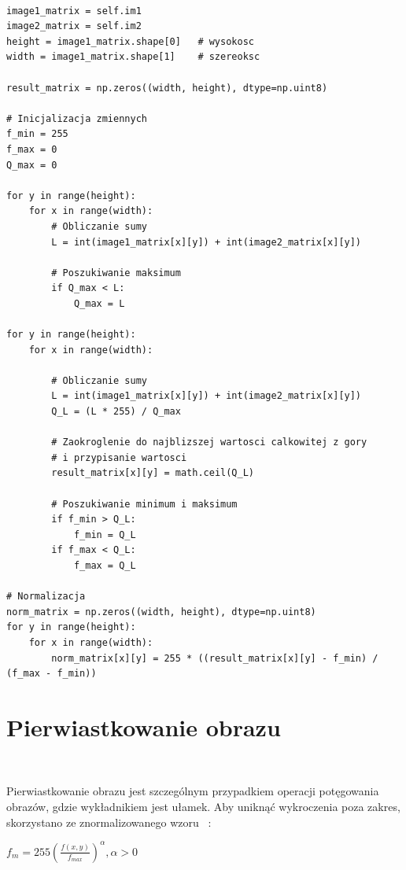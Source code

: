 \documentclass[final,a4paper,openany,12pt]{mwbk}
\begin{document}
\begin{lstlisting}[caption=Dzielenie obrazu szarego przez przez inny obraz]

image1_matrix = self.im1
image2_matrix = self.im2
height = image1_matrix.shape[0]   # wysokosc
width = image1_matrix.shape[1]    # szereoksc

result_matrix = np.zeros((width, height), dtype=np.uint8)

# Inicjalizacja zmiennych
f_min = 255
f_max = 0
Q_max = 0

for y in range(height):
    for x in range(width):  
        # Obliczanie sumy
        L = int(image1_matrix[x][y]) + int(image2_matrix[x][y])
        
        # Poszukiwanie maksimum
        if Q_max < L:
            Q_max = L

for y in range(height):
    for x in range(width):  

        # Obliczanie sumy
        L = int(image1_matrix[x][y]) + int(image2_matrix[x][y])
        Q_L = (L * 255) / Q_max

        # Zaokroglenie do najblizszej wartosci calkowitej z gory
        # i przypisanie wartosci
        result_matrix[x][y] = math.ceil(Q_L)

        # Poszukiwanie minimum i maksimum
        if f_min > Q_L:
            f_min = Q_L
        if f_max < Q_L:
            f_max = Q_L

# Normalizacja
norm_matrix = np.zeros((width, height), dtype=np.uint8)
for y in range(height):
    for x in range(width):
        norm_matrix[x][y] = 255 * ((result_matrix[x][y] - f_min) / (f_max - f_min))

\end{lstlisting}
\newpage

\section {Pierwiastkowanie obrazu}
\hfill\\
\indent
		\begin{center} Pierwiastkowanie obrazu jest szczególnym przypadkiem operacji potęgowania obrazów, gdzie wykładnikiem jest ułamek. Aby uniknąć wykroczenia poza zakres, skorzystano ze znormalizowanego wzoru ~\cite{WykRat}:

		$f_{m} = 255(\frac{f(x,y)}{f_{max}}) ^{\alpha}, \alpha > 0 $
	\end{center}
	
\end{document}
